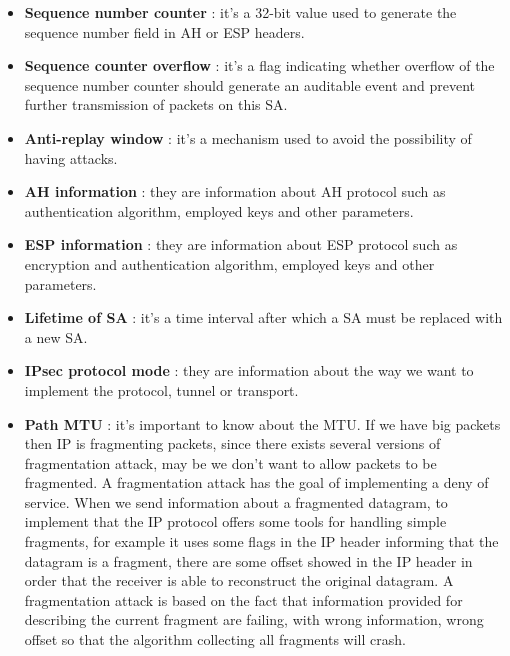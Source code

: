 \documentclass[11pt]{article}
\begin{document}
\begin{itemize}
\item \textbf{Sequence number counter} : it's a 32-bit value used to generate the sequence number field in AH or ESP headers.
\item \textbf{Sequence counter overflow} : it's a flag indicating whether overflow of the sequence number counter should generate an auditable event and prevent further transmission of packets on this SA.
\item \textbf{Anti-replay window} : it's a mechanism used to avoid the possibility of having attacks.
\item \textbf{AH information} : they are information about AH protocol such as authentication algorithm, employed keys and other parameters.
\item \textbf{ESP information} : they are information about ESP protocol such as encryption and authentication algorithm, employed keys and other parameters.
\item \textbf{Lifetime of SA} : it's a time interval after which a SA must be replaced with a new SA.
\item \textbf{IPsec protocol mode} : they are information about the way we want to implement the protocol, tunnel or transport.
\item \textbf{Path MTU} : it's important to know about the MTU. If we have big packets then IP is fragmenting packets, since there exists several versions of fragmentation attack, may be we don't want to allow packets to be fragmented. A fragmentation attack has the goal of implementing a deny of service.  When we send information about a fragmented datagram, to implement that the IP protocol offers some tools for handling simple fragments, for example it uses some flags in the IP header informing that the datagram is a fragment, there are some offset showed in the IP header in order that the receiver is able to reconstruct the original datagram. A fragmentation attack is based on the fact that information provided for describing the current fragment are failing, with wrong information, wrong offset so that the algorithm collecting all fragments will crash. 
\end{itemize}
\end{document}
